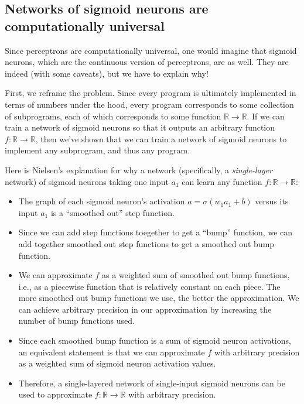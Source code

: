 \documentclass{article}
\begin{document}
	\subsection*{Networks of sigmoid neurons are computationally universal}
	
	Since perceptrons are computationally universal, one would imagine that sigmoid neurons, which are the continuous version of perceptrons, are as well. They are indeed (with some caveats), but we have to explain why!
	
	First, we reframe the problem. Since every program is ultimately implemented in terms of numbers under the hood, every program corresponds to some collection of subprograms, each of which corresponds to some function $\mathbb{R} \rightarrow \mathbb{R}$. If we can train a network of sigmoid neurons so that it outputs an arbitrary function $f:\mathbb{R} \rightarrow \mathbb{R}$, then we've shown that we can train a network of sigmoid neurons to implement any subprogram, and thus any program.
	
	Here is Nielsen's explanation for why a network (specifically, a \textit{single-layer} network) of sigmoid neurons taking one input $a_1$  can learn any function $f:\mathbb{R} \rightarrow \mathbb{R}$:
		
	\begin{itemize}
		\item The graph of each sigmoid neuron's activation $a = \sigma(w_1 a_1 + b)$ versus its input $a_1$ is a ``smoothed out'' step function.
		\item Since we can add step functions toegether to get a ``bump'' function, we can add together smoothed out step functions to get a smoothed out bump function.
		\item We can approximate $f$ as a weighted sum of smoothed out bump functions, i.e., as a piecewise function that is relatively constant on each piece. The more smoothed out bump functions we use, the better the approximation. We can achieve arbitrary precision in our approximation by increasing the number of bump functions used.
		\item Since each smoothed bump function is a sum of sigmoid neuron activations, an equivalent statement is that we can approximate $f$ with arbitrary precision as a weighted sum of sigmoid neuron activation values.
		\item Therefore, a single-layered network of single-input sigmoid neurons can be used to approximate $f:\mathbb{R} \rightarrow \mathbb{R}$ with arbitrary precision.
	\end{itemize}
	
\end{document}
